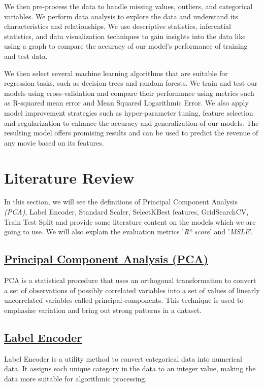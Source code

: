 \documentclass[conference]{IEEEtran}
\begin{document}
        We then pre-process the data to handle missing values, outliers, and categorical variables. We perform data analysis to explore the data and understand its characteristics and relationships. We use descriptive statistics, inferential statistics, and data visualization techniques to gain insights into the data like using a graph to compare the accuracy of our model's performance of training and test data.

        We then select several machine learning algorithms that are suitable for regression tasks, such as decision trees and random forests. We train and test our models using cross-validation and compare their performance using metrics such as R-squared mean error and Mean Squared Logarithmic Error. We also apply model improvement strategies such as hyper-parameter tuning, feature selection and regularization to enhance the accuracy and generalization of our models. The resulting model offers promising results and can be used to predict the revenue of any movie based on its features.

\section{Literature Review}
    In this section, we will see the definitions of Principal Component Analysis \textit{(PCA)}, Label Encoder, Standard Scaler, SelectKBest features, GridSearchCV, Train Test Split and provide some literature content on the models which we are going to use. We will also explain the evaluation metrics '\textit{R² score}' and '\textit{MSLE}'.

    \subsection*{\href{https://en.wikipedia.org/wiki/Principal_component_analysis}{Principal Component Analysis (PCA)}}
    PCA is a statistical procedure that uses an orthogonal transformation to convert a set of observations of possibly correlated variables into a set of values of linearly uncorrelated variables called principal components. This technique is used to emphasize variation and bring out strong patterns in a dataset.

    \subsection*{\href{https://scikit-learn.org/stable/modules/generated/sklearn.preprocessing.LabelEncoder.html}{Label Encoder}}
    Label Encoder is a utility method to convert categorical data into numerical data. It assigns each unique category in the data to an integer value, making the data more suitable for algorithmic processing.
\end{document}
